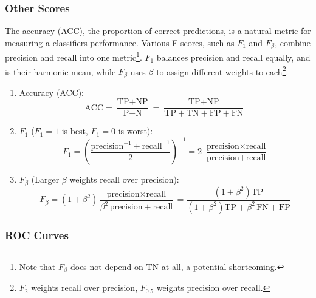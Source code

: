 \subsubsection{Other Scores}
\label{ml:general:eval:other_scores}

The accuracy (ACC), the proportion of correct predictions, is a natural metric for measuring a classifiers performance.
Various F-scores, such as $F_{1}$ and $F_{\beta}$, combine precision and recall into one metric\footnote{Note that $F_{\beta}$ does not depend on TN at all, a potential shortcoming.}.
$F_{1}$ balances precision and recall equally, and is their harmonic mean,
while $F_{\beta}$ uses $\beta$ to assign different weights to each\footnote{$F_{2}$ weights recall over precision, $F_{0.5}$ weights precision over recall.}.

\begin{enumerate}[noitemsep]
\item Accuracy (ACC):
\begin{equation} \label{eq:ACC}
\text{ACC} = \frac{\text{TP}+\text{NP}}{\text{P}+\text{N}} = \frac{\text{TP}+\text{NP}}{\text{TP}+\text{TN}+\text{FP}+\text{FN}}
\end{equation}

\item $F_{1}$ ($F_{1}=1$ is best, $F_{1}=0$ is worst):
\begin{equation} \label{eq:F1}
F_{1} = \left(\frac{\text{precision}^{-1}+\text{recall}^{-1}}{2}\right)^{-1} = 2\,\,\frac{\text{precision} \times \text{recall}}{\text{precision} + \text{recall}}
\end{equation}

\item $F_{\beta}$ (Larger $\beta$ weights recall over precision):
\begin{equation} \label{eq:Fbeta}
F_{\beta} = \left(1+\beta^{2}\right) \frac{\text{precision} \times \text{recall}}{\beta^{2}\,\text{precision} + \text{recall}} =
\frac{\left(1+\beta^{2}\right) \text{TP}}{\left(1+\beta^{2}\right) \text{TP} + \beta^{2}\,\text{FN} + \text{FP}}
\end{equation}
\end{enumerate}

\subsubsection{ROC Curves}
\label{ml:general:eval:ROC}


